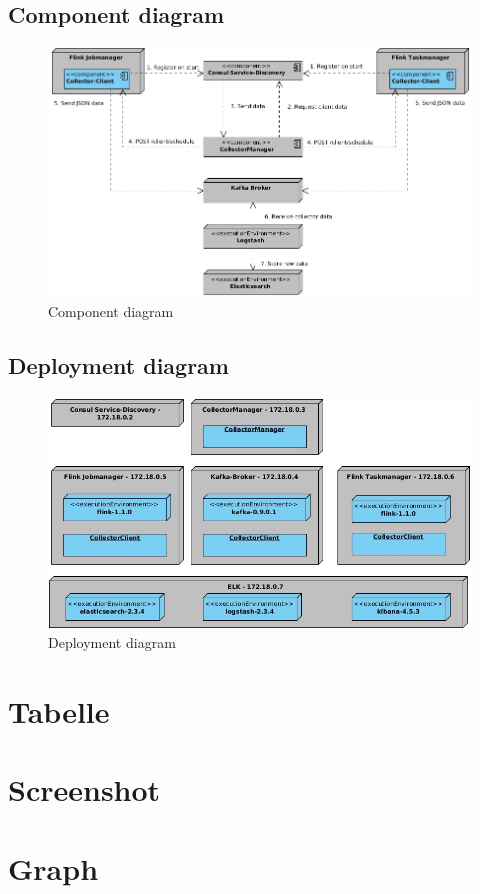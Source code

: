 \subsection{Component diagram}
\begin{figure}[H]
	\centering
	\includegraphics[width=1.0\textwidth]{../uml/component-diagram.jpg}
	\caption{Component diagram}
	\label{component-diagram}
\end{figure}

\subsection{Deployment diagram}
\begin{figure}[H]
	\centering
	\includegraphics[width=1.0\textwidth]{../uml/deployment-diagram.jpg}
	\caption{Deployment diagram}
	\label{deployment-diagram}
\end{figure}

\section{Tabelle}

\section{Screenshot}

\section{Graph}